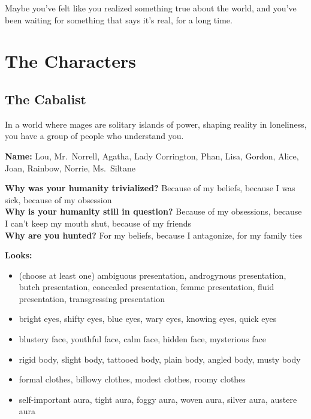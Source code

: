 \documentclass[
  oneside,
  statementpaper,
  9pt]{memoir}
\begin{document}
Maybe you've felt like you realized something true about the world, and
you've been waiting for something that says it's real, for a long time.

\newpage

\setlength{\parindent}{0em}

\hypertarget{the-characters}{%
\chapter{The Characters}\label{the-characters}}

\hypertarget{the-cabalist}{%
\section{The Cabalist}\label{the-cabalist}}

In a world where mages are solitary islands of power, shaping reality in
loneliness, you have a group of people who understand you.

\textbf{Name:} Lou, Mr.~Norrell, Agatha, Lady Corrington, Phan, Lisa,
Gordon, Alice, Joan, Rainbow, Norrie, Ms.~Siltane

\textbf{Why was your humanity trivialized?} Because of my beliefs,
because I was sick, because of my obsession\\
\textbf{Why is your humanity still in question?} Because of my
obsessions, because I can't keep my mouth shut, because of my friends\\
\textbf{Why are you hunted?} For my beliefs, because I antagonize, for
my family ties

\textbf{Looks:}

\begin{itemize}
\tightlist
\item
  (choose at least one) ambiguous presentation, androgynous
  presentation, butch presentation, concealed presentation, femme
  presentation, fluid presentation, transgressing presentation
\item
  bright eyes, shifty eyes, blue eyes, wary eyes, knowing eyes, quick
  eyes
\item
  blustery face, youthful face, calm face, hidden face, mysterious face
\item
  rigid body, slight body, tattooed body, plain body, angled body, musty
  body
\item
  formal clothes, billowy clothes, modest clothes, roomy clothes
\item
  self-important aura, tight aura, foggy aura, woven aura, silver aura,
  austere aura
\end{itemize}
\end{document}
